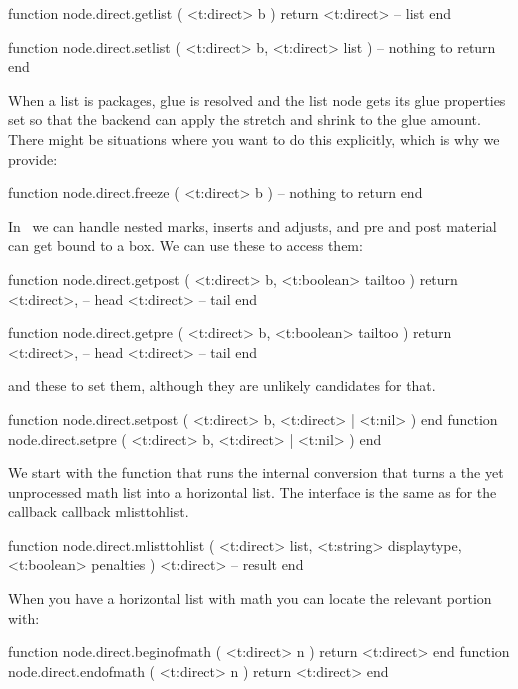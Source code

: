 \starttyping[option=LUA]
function node.direct.getlist ( <t:direct> b )
    return <t:direct> -- list
end

function node.direct.setlist ( <t:direct> b, <t:direct> list )
    -- nothing to return
end
\stoptyping

When a list is packages, glue is resolved and the list node gets its glue properties
set so that the backend can apply the stretch and shrink to the glue amount. There might
be situations where you want to do this explicitly, which is why we provide:

\starttyping[option=LUA]
function node.direct.freeze ( <t:direct> b )
    -- nothing to return
end
\stoptyping

In \LUAMETATEX\ we can handle nested marks, inserts and adjusts, and
pre and post material can get bound to a box. We can use these to access them:

\starttyping[option=LUA]
function node.direct.getpost ( <t:direct> b, <t:boolean> tailtoo )
    return
        <t:direct>, -- head
        <t:direct>  -- tail
end

function node.direct.getpre ( <t:direct> b, <t:boolean> tailtoo )
    return
        <t:direct>, -- head
        <t:direct>  -- tail
end
\stoptyping

and these to set them, although they are unlikely candidates for that.

\starttyping[option=LUA]
function node.direct.setpost ( <t:direct> b, <t:direct> | <t:nil> ) end
function node.direct.setpre  ( <t:direct> b, <t:direct> | <t:nil> ) end
\stoptyping

\stopsubsection

\startsubsection[title={Math}]

We start with the function that runs the internal 
conversion that turns a the yet unprocessed math list into a horizontal list. The
interface is the same as for the callback callback {mlisttohlist}.

\starttyping[option=LUA]
function node.direct.mlisttohlist (
    <t:direct>  list,
    <t:string>  displaytype,
    <t:boolean> penalties
)
   <t:direct> -- result
end
\stoptyping

When you have a horizontal list with math you can locate the relevant portion
with:

\starttyping[option=LUA]
function node.direct.beginofmath ( <t:direct> n ) return <t:direct> end
function node.direct.endofmath   ( <t:direct> n ) return <t:direct> end
\stoptyping

